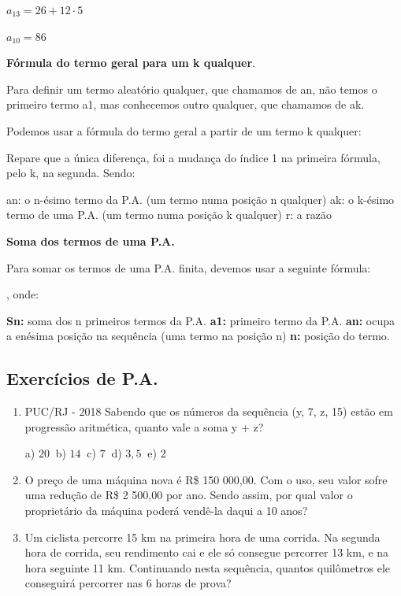 \begin{multicols*}{2}
	$ a_{13} = 26 + 12 \cdot 5 $

	$ a_{10} = 86 $\color{black}

	\textbf{Fórmula do termo geral para um k qualquer}.

	Para definir um termo aleatório qualquer, que chamamos de an, não temos o primeiro termo a1, mas conhecemos outro qualquer, que chamamos de ak.

	Podemos usar a fórmula do termo geral a partir de um termo k qualquer:


	Repare que a única diferença, foi a mudança do índice 1 na primeira fórmula, pelo k, na segunda. Sendo:

	an: o n-ésimo termo da P.A. (um termo numa posição n qualquer)
	ak: o k-ésimo termo de uma P.A. (um termo numa posição k qualquer)
	r: a razão

	\textbf{Soma dos termos de uma P.A.}

	Para somar os termos de uma P.A. finita, devemos usar a seguinte fórmula:

		, onde:

	\textbf{Sn:} soma dos n primeiros termos da P.A.
	\textbf{a1:} primeiro termo da P.A.
	\textbf{an:} ocupa a enésima posição na sequência (uma termo na posição n)
	\textbf{n:} posição do termo.

	\subsection{Exercícios de P.A.}

	\begin{enumerate}

		\item PUC/RJ - 2018 Sabendo que os números da sequência (y, 7, z, 15) estão em progressão aritmética, quanto vale a soma y + z?

		      a) $20 \ $ b) $14 \ $ c) $7 \ $ d) $3,5 \ $ e) $2 $

		\item O preço de uma máquina nova é R\$ 150 000,00. Com o uso, seu valor sofre uma redução de R\$ 2 500,00 por ano. Sendo assim, por qual valor o proprietário da máquina poderá vendê-la daqui a 10 anos?

		\item Um ciclista percorre 15 km na primeira hora de uma corrida. Na segunda hora de corrida, seu rendimento cai e ele só consegue percorrer 13 km, e na hora seguinte 11 km. Continuando nesta sequência, quantos quilômetros ele conseguirá percorrer nas 6 horas de prova?


\end{enumerate}
\end{multicols*}
